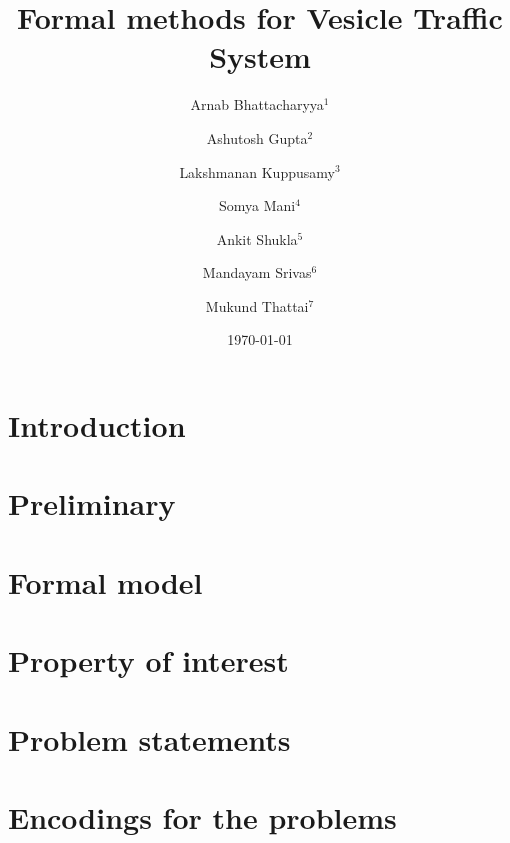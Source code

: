 \documentclass[]{llncs}
\begin{document}
\title{Formal methods for Vesicle Traffic System}

\author{Arnab Bhattacharyya$^1$ \and Ashutosh Gupta$^2$ \and Lakshmanan Kuppusamy$^3$ \and Somya Mani$^4$ \and Ankit Shukla$^5$ \and Mandayam Srivas$^6$ \and Mukund Thattai$^7$ } 


\date{\today}

\maketitle

\begin{abstract}

\end{abstract}

\section{Introduction}
\label{sec:intro}


%

\section{Preliminary}
\label{sec:prelim}


\section{Formal model}
\label{sec:model}


\section{Property of interest}
\label{sec:property}


\section{Problem statements}
\label{sec:problem}


\section{Encodings for the problems}
\label{sec:encoding}

\end{document}
